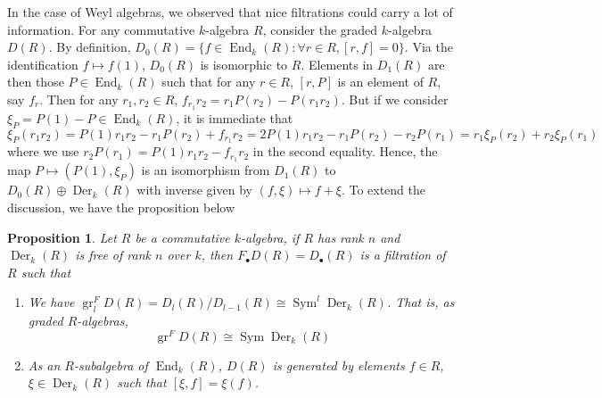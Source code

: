 \documentclass[11pt, a4paper]{article}
\newtheorem{proposition}[theorem]{Proposition}
\theoremstyle{definition}
\newcommand{\gr}{\operatorname{gr}}
\newcommand{\Sym}[0]{\operatorname{Sym}}
\newcommand{\End}[0]{\operatorname{End}}
\newcommand{\Der}{\operatorname{Der}}
\begin{document}
    In the case of Weyl algebras, we observed that nice filtrations could carry a lot of information. For any commutative $k$-algebra $R$, consider the graded $k$-algebra $D(R)$. By definition, $D_0(R)=\{f\in \End_k(R):\forall r\in R, [r, f]=0\}$. Via the identification $f\mapsto f(1)$, $D_0(R)$ is isomorphic to $R$. Elements in $D_1(R)$ are then those $P\in\End_k(R)$ such that for any $r\in R$, $[r, P]$ is an element of $R$, say $f_r$. Then for any $r_1, r_2\in R$, $f_{r_1}r_2=r_1P(r_2)-P(r_1r_2)$. But if we consider $\xi_P=P(1)-P\in\End_k(R)$, it is immediate that
    \[\xi_P(r_1r_2)=P(1)r_1r_2-r_1P(r_2)+f_{r_1}r_2=2P(1)r_1r_2-r_1P(r_2)-r_2P(r_1)=r_1\xi_P(r_2)+r_2\xi_P(r_1)\]
    where we use $r_2P(r_1)=P(1)r_1r_2-f_{r_1}r_2$ in the second equality. Hence, the map $P\mapsto (P(1), \xi_P)$ is an isomorphism from $D_1(R)$ to $D_0(R)\oplus\Der_k(R)$ with inverse given by $(f, \xi)\mapsto f+\xi$. To extend the discussion, we have the proposition below
    \begin{proposition}\label{prop-d-filtration}
        Let $R$ be a commutative $k$-algebra, if $R$ has rank $n$ and $\Der_k(R)$ is free of rank $n$ over $k$, then $F_\bullet D(R)=D_\bullet(R)$ is a filtration of $R$ such that
        \begin{enumerate}[\normalfont(i)]
            \item We have $\gr^F_l D(R)=D_l(R)/D_{l-1}(R)\cong\Sym^l \Der_k(R)$. That is, as graded $R$-algebras,
            \[\gr^F D(R)\cong\Sym \Der_k(R)\]
            \item As an $R$-subalgebra of $\End_k(R)$, $D(R)$ is generated by elements $f\in R$, $\xi\in\Der_k(R)$ such that $[\xi, f]=\xi(f)$.
        \end{enumerate}
    \end{proposition}
\end{document}
